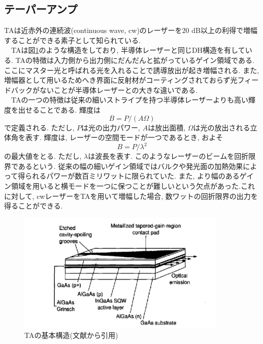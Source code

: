 \documentclass[uplatex, dvipdfmx, a4paper, report, papersize, 11pt]{jsbook}
\begin{document}
\subsection{テーパーアンプ}
 TAは近赤外の連続波(continuous wave,  cw)のレーザーを$20$ dB以上の利得で増幅することができる素子として知られている\cite{Cruz:06}.\\
　TAは図\ref{TA_structure}のような構造をしており, 半導体レーザーと同じDH構造を有している. TAの特徴は入力側から出力側にだんだんと拡がっているゲイン領域である. ここにマスター光と呼ばれる光を入れることで誘導放出が起き増幅される. また, 増幅器として用いるためへき界面に反射材がコーティングされておらず光フィードバックがないことが半導体レーザーとの大きな違いである.\\
　TAの一つの特徴は従来の細いストライプを持つ半導体レーザーよりも高い輝度を出せることである. 輝度は
 \begin{equation}
   B = P/(A\Omega)
 \end{equation}
で定義される. ただし, $P$は光の出力パワー, $A$は放出面積, $\Omega$は光の放出される立体角を表す. 輝度は, レーザーの空間モードが一つであるとき, およそ
\begin{equation}
  B = P/\lambda^2
\end{equation}
の最大値をとる\cite{Walpole1996}. ただし, $\lambda$は波長を表す. このようなレーザーのビームを回折限界であるという. 従来の幅の細いゲイン領域ではバルクや発光面の加熱効果によって得られるパワーが数百ミリワットに限られていた. また, より幅のあるゲイン領域を用いると横モードを一つに保つことが難しいという欠点があった.これに対して, cwレーザーをTAを用いて増幅した場合, 数ワットの回折限界の出力を得ることができる\cite{Walpole1996}.


\begin{figure}[htbp]
 \begin{center}
  \includegraphics[width=100mm]{figures/chapter2/TA_structure.png}
 \end{center}
 \caption{TAの基本構造(文献\cite{Walpole1996}から引用)}
 \label{TA_structure}
\end{figure}
\end{document}
